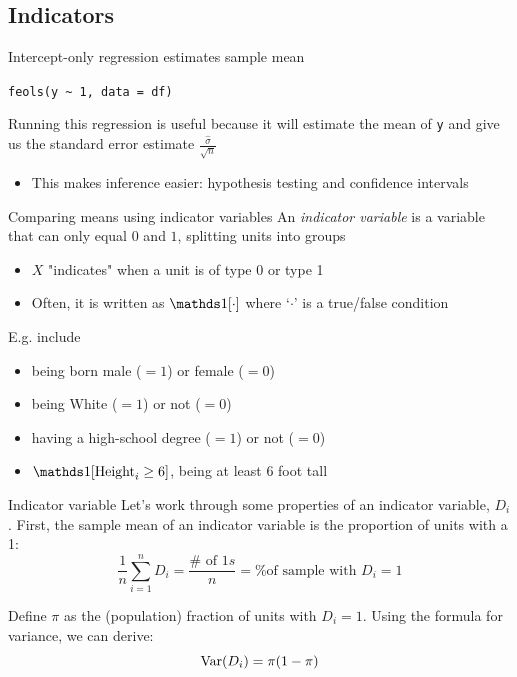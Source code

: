 \documentclass[aspectratio=169,t,11pt,table]{beamer}
\begin{document}



\subsection{Indicators}

\begin{frame}{Intercept-only regression estimates sample mean}
  \begin{center}
    \texttt{feols(y \textasciitilde{} 1, data = df)}
  \end{center}

  \bigskip
  Running this regression is useful because it will estimate the mean of \texttt{y} and give us the standard error estimate $\frac{\hat{\sigma}}{\sqrt{n}}$
  \begin{itemize}
    \item This makes inference easier: hypothesis testing and confidence intervals 
  \end{itemize}
\end{frame}

\begin{frame}{Comparing means using indicator variables}
  An \emph{indicator variable} is a variable that can only equal $0$ and $1$, splitting units into groups
  \begin{itemize}
    \item $X$ "indicates" when a unit is of type 0 or type 1
    
    \item Often, it is written as $\one{\cdot}$ where `$\cdot$' is a true/false condition
  \end{itemize}

  \bigskip
  E.g. include
  \begin{itemize}
    \item being born male ($= 1$) or female ($= 0$)
    \item being White ($= 1$) or not ($= 0$)
    \item having a high-school degree ($= 1$) or not ($= 0$)
    \item $\one{\text{Height}_i \geq 6}$, being at least 6 foot tall
  \end{itemize} 
\end{frame}

\begin{frame}{Indicator variable}
  Let's work through some properties of an indicator variable, $D_i$. First, the sample mean of an indicator variable is the proportion of units with a 1:
  $$
    \frac{1}{n} \sum_{i=1}^n D_i = 
    \frac{\# \text{ of } 1{s}}{n} = 
    \text{\% of sample with } D_i = 1
  $$
  
  \pause
  \bigskip\bigskip
  Define $\pi$ as the (population) fraction of units with $D_i = 1$.
  Using the formula for variance, we can derive:
  $$
    \var(D_i) = \pi (1 - \pi)
  $$
\end{frame}
\end{document}
